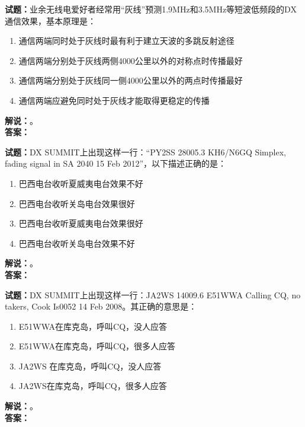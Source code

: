\documentclass{ctexbook}
\begin{document}
\vspace{\baselineskip}

\noindent\textbf{试题：}业余无线电爱好者经常用“灰线”预测1.9\unit{\MHz}和3.5\unit{\MHz}等短波低频段的DX通信效果，基本原理是：
\begin{enumerate}[leftmargin=3em]
  \item 通信两端同时处于灰线时最有利于建立天波的多跳反射途径
  \item 通信两端分别处于灰线两侧4000公里以外的对称点时传播最好
  \item 通信两端分别处于灰线同一侧4000公里以外的两点时传播最好
  \item 通信两端应避免同时处于灰线才能取得更稳定的传播
\end{enumerate}
\noindent\textbf{解说：}\textbf{}。\\\noindent\textbf{答案：}

\vspace{\baselineskip}

\noindent\textbf{试题：}DX SUMMIT上出现这样一行：“PY2SS 28005.3 KH6/N6GQ Simplex, fading signal in SA 2040 15 Feb 2012”，以下描述正确的是：
\begin{enumerate}[leftmargin=3em]
  \item 巴西电台收听夏威夷电台效果不好
  \item 巴西电台收听关岛电台效果很好
  \item 巴西电台收听夏威夷电台效果很好
  \item 巴西电台收听关岛电台效果不好
\end{enumerate}
\noindent\textbf{解说：}\textbf{}。\\\noindent\textbf{答案：}

\vspace{\baselineskip}

\noindent\textbf{试题：}DX SUMMIT上出现这样一行：JA2WS 14009.6 E51WWA Calling CQ, no takers, Cook Is0052 14 Feb 2008。其正确的意思是：
\begin{enumerate}[leftmargin=3em]
  \item E51WWA在库克岛，呼叫CQ，没人应答
  \item E51WWA在库克岛，呼叫CQ，很多人应答
  \item JA2WS 在库克岛，呼叫CQ，没人应答
  \item JA2WS在库克岛，呼叫CQ，很多人应答
\end{enumerate}
\noindent\textbf{解说：}\textbf{}。\\\noindent\textbf{答案：}

\vspace{\baselineskip}
\end{document}
